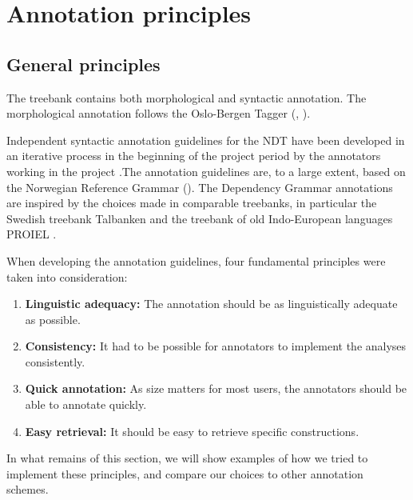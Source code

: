 \documentclass[11pt,a4paper]{article}
\begin{document}

\section{Annotation principles}
\subsection{General principles}


The treebank contains both morphological and syntactic annotation. The morphological annotation follows the Oslo-Bergen Tagger (, ).

Independent syntactic annotation guidelines for the NDT have been developed in an iterative process in the beginning of the project period by the annotators working in the project \cite{Kin:Sol:Eri:2013}.The annotation guidelines are, to a large extent, based on the Norwegian Reference Grammar (). The Dependency Grammar annotations are  inspired by the choices made in comparable treebanks, in particular the Swedish treebank Talbanken \cite{Niv:Nil:Hal:2006} and the treebank of old Indo-European languages PROIEL \cite{Hau:Joh:Eck:Wel:Her:Mut:2009}.

When developing the annotation guidelines, four fundamental principles were taken into consideration:
\begin{enumerate}
 \item \textbf{Linguistic adequacy:} The annotation should be as linguistically adequate as possible.
 \item \textbf{Consistency:} It had to be possible for annotators to implement the analyses consistently.
 \item \textbf{Quick annotation:} As size matters for most users, the annotators should be able to annotate quickly.
 \item \textbf{Easy retrieval:} It should be easy to retrieve specific constructions.
\end{enumerate}
In what remains of this section, we will show examples of how we tried to implement these principles, and compare our choices to other annotation schemes.
\end{document}
